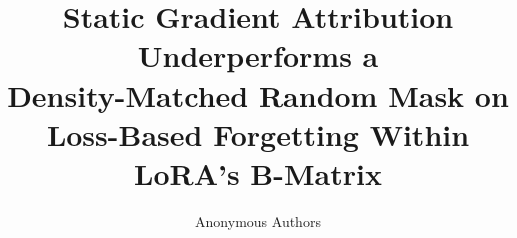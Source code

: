 \documentclass{article}
\title{Static Gradient Attribution Underperforms a\\
Density-Matched Random Mask on Loss-Based Forgetting
Within LoRA's B-Matrix}
\author{
  Anonymous Authors
}
\begin{document}
\maketitle

\begin{abstract}

\end{abstract}














\newpage
\appendix

\end{document}
